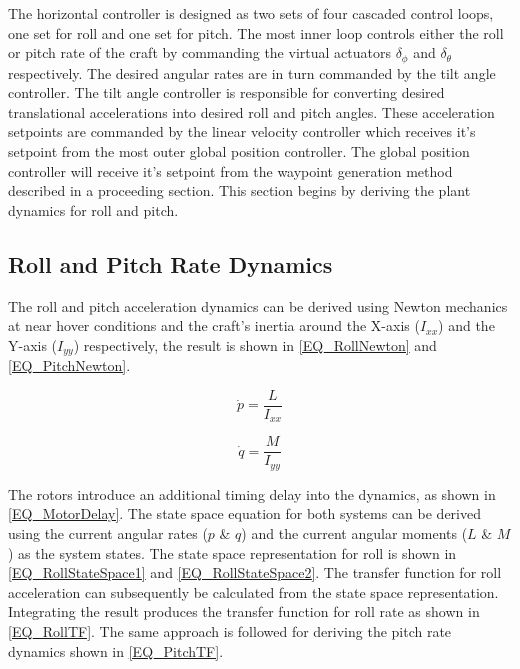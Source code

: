 The horizontal controller is designed as two sets of four cascaded control loops, one set for roll and one set for pitch. The most inner loop controls either the roll or pitch rate of the craft by commanding the virtual actuators $\delta_\phi$ and $\delta_\theta$ respectively. The desired angular rates are in turn commanded by the tilt angle controller. The tilt angle controller is responsible for converting desired translational accelerations into desired roll and pitch angles. These acceleration setpoints are commanded by the linear velocity controller which receives it's setpoint from the most outer global position controller. The global position controller will receive it's setpoint from the waypoint generation method described in a proceeding section. This section begins by deriving the plant dynamics for roll and pitch.
	
	\subsection{Roll and Pitch Rate Dynamics}
	The roll and pitch acceleration dynamics can be derived using Newton mechanics at near hover conditions and the craft's inertia around the X-axis ($I_{xx}$) and the Y-axis ($I_{yy}$) respectively, the result is shown in \eqref{EQ_RollNewton} and \eqref{EQ_PitchNewton}.
	
	\begin{equation}
	\label{EQ_RollNewton}
	\dot{p} = \dfrac{L}{I_{xx}}
	\end{equation}
	
	\begin{equation}
	\label{EQ_PitchNewton}
	\dot{q} = \dfrac{M}{I_{yy}}
	\end{equation}
	
	The rotors introduce an additional timing delay into the dynamics, as shown in \eqref{EQ_MotorDelay}. The state space equation for both systems can be derived using the current angular rates ($p$ \& $q$) and the current angular moments ($L$ \& $M$) as the system states. The state space representation for roll is shown in \eqref{EQ_RollStateSpace1} and \eqref{EQ_RollStateSpace2}. The transfer function for roll acceleration can subsequently be calculated from the state space representation. Integrating the result produces the transfer function for roll rate as shown in \eqref{EQ_RollTF}. The same approach is followed for deriving the pitch rate dynamics shown in \ref{EQ_PitchTF}.
	
